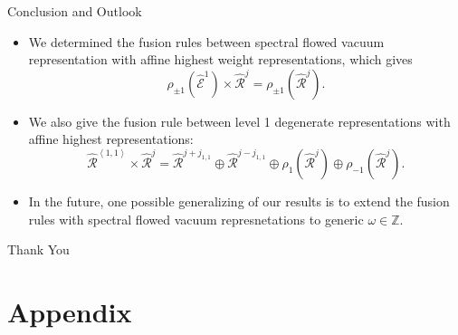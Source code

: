 \documentclass{beamer}
\newcommand{\vev}[1]{\left\langle #1 \right\rangle}
\begin{document}
\begin{frame}{Conclusion and Outlook}
  \begin{itemize}
    \item We determined the fusion rules between spectral flowed vacuum representation with affine highest weight representations, which 
        gives 
        \begin{equation}
          \rho_{\pm 1} \left( \hat{\mathcal{E}}^{1} \right) \times \hat{\mathcal{R}}^{j} = \rho_{\pm 1} \left( \hat{\mathcal{R}}^{j} \right).
        \end{equation}
    \item We also give the fusion rule between level 1 degenerate representations 
          with affine highest representations: 
        \begin{equation}
           \widehat{\mathcal{R}}^{\vev{1,1}} \times \widehat{\mathcal{R}}^{j} = \widehat{\mathcal{R}}^{j+j_{1,1}} \oplus \widehat{\mathcal{R}}^{j-j_{1,1}}
            \oplus \rho_{1} \left( \widehat{\mathcal{R}}^{j} \right) \oplus \rho_{-1} \left( \widehat{\mathcal{R}}^{j} \right). 
        \end{equation}
    \item In the future, one possible generalizing of our results is to extend the fusion rules with spectral flowed vacuum represnetations 
          to generic $\omega \in \mathbb{Z}$.
  \end{itemize}
\end{frame}


\begin{frame}[plain]
  \vfill
  \begin{center}
    \Huge Thank You
  \end{center}
  \vfill
\end{frame}

\section*{Appendix}
\end{document}
